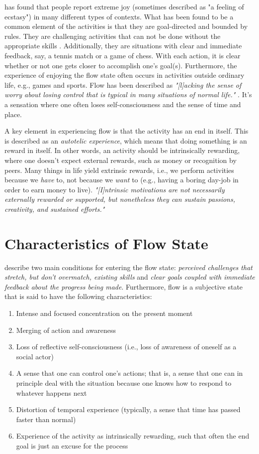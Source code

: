 \cite{flow} has found that people report extreme joy (sometimes described as "a feeling of ecstasy") in many different types of contexts. What has been found to be a common element of the activities is that they are goal-directed and bounded by rules. They are challenging activities that can not be done without the appropriate skills \citep{flow}. Additionally, they are situations with clear and immediate feedback, say, a tennis match or a game of chess. With each action, it is clear whether or not one gets closer to accomplish one's goal(s). Furthermore, the experience of enjoying the flow state often occurs in activities outside ordinary life, e.g., games and sports. Flow has been described as \textit{"[l]acking the sense of worry about losing control that is typical in many situations of normal life."} \citep{flow}. It's a sensation where one often loses self-consciousness and the sense of time and place.

A key element in experiencing flow is that the activity has an end in itself. This is described as an \textit{autotelic experience}, which means that doing something is an reward in itself. In other words, an activity should be intrinsically rewarding, where one doesn't expect external rewards, such as money or recognition by peers. Many things in life yield extrinsic rewards, i.e., we perform activities because we \textit{have} to, not because we \textit{want} to (e.g., having a boring day-job in order to earn money to live). \textit{"[I]ntrinsic motivations are not necessarily externally rewarded or supported, but nonetheless they can sustain passions, creativity, and sustained efforts."} \citep{sdt_website}

\section{Characteristics of Flow State} \label{char}
\cite{flowTwo} describe two main conditions for entering the flow state: \textit{perceived challenges that stretch, but don't overmatch, existing skills} and \textit{clear goals coupled with immediate feedback about the progress being made}. Furthermore, flow is a subjective state that is said to have the following characteristics: \citep{flowTwo}

\begin{enumerate}
\item Intense and focused concentration on the present moment
\item Merging of action and awareness
\item Loss of reflective self-consciousness (i.e., loss of awareness of oneself as a social actor)
\item A sense that one can control one's actions; that is, a sense that one can in principle deal with the situation because one knows how to respond to whatever happens next
\item Distortion of temporal experience (typically, a sense that time has passed faster than normal)
\item Experience of the activity as intrinsically rewarding, such that often the end goal is just an excuse for the process
\end{enumerate}

